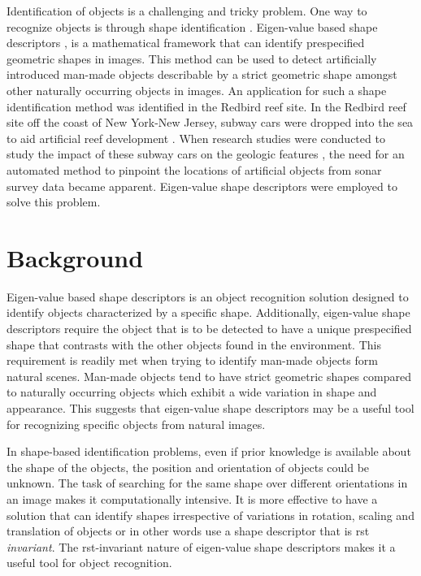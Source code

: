 \documentclass {udthesis}
\begin{document}
Identification of objects is a challenging and tricky problem. One way to recognize objects is through shape identification \cite{shape_survey}. Eigen-value based shape descriptors \cite{khabou,zuliani}, is a mathematical framework that can identify prespecified geometric shapes in images. This method can be used to detect artificially introduced man-made objects describable by a strict geometric shape amongst other naturally occurring objects in images. An application for such a shape identification method was identified in the Redbird reef site. In the Redbird reef site off the coast of New York-New Jersey, subway cars were dropped into the sea to aid artificial reef development \cite{redbird1, redbird2}. When research studies were conducted to study the impact of these subway cars on the geologic features \cite{redbird_nicole, redbird_art}, the need for an automated method to pinpoint the 
locations of artificial objects 
from sonar survey data became apparent. Eigen-value shape descriptors were employed to solve this problem.


\section{Background}

Eigen-value based shape descriptors is an object recognition solution designed to identify objects characterized by a specific shape. Additionally, eigen-value shape descriptors require the object that is to be detected to have a unique prespecified shape that contrasts with the other objects found in the environment. This requirement is readily met when trying to identify man-made objects form natural scenes. Man-made objects tend to have strict geometric shapes compared to naturally occurring objects which exhibit a wide variation in shape and appearance. This suggests that eigen-value shape descriptors may be a useful tool for recognizing specific objects from natural images.

In shape-based identification problems, even if prior knowledge is available about the shape of the objects, the position and orientation of objects could be unknown. The task of searching for the same shape over different orientations in an image makes it computationally intensive. It is more effective to have a solution that can identify shapes irrespective of variations in rotation, scaling and translation of objects or in other words use a shape descriptor that is \gls{rst} \textit{invariant}. The \gls{rst}-invariant nature of eigen-value shape descriptors makes it a useful tool for object recognition. 
\end{document}
